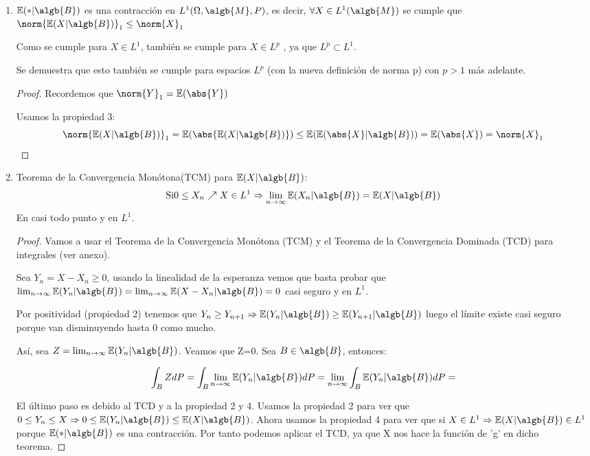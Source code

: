 \documentclass{apuntes}
\begin{document}
\begin{enumerate}
\begin{proof}
\end{proof} 
\item $\mathbb{E}(*|\algb{B})$ es una contracción en $L^1(\Omega, \algb{M},P)$, es decir, $\forall X \in L^1(\algb{M})$ se cumple que $\norm{\mathbb{E}(X|\algb{B})}_1 \leq \norm{X}_1$

\obs Como se cumple para $X \in L^1$, también se cumple para $X \in L^p$ , ya que $L^p \subset L^1$. 

\obs Se demuestra que esto también se cumple para espacios $L^p$ (con la nueva definición de norma p) con $p>1$ más adelante.

\begin{proof}

Recordemos que $\norm{Y}_1 = \mathbb{E}(\abs{Y})$

Usamos la propiedad 3:
\[\norm{\mathbb{E}(X|\algb{B})}_1=
\mathbb{E}(\abs{\mathbb{E}(X|\algb{B})}) \leq \mathbb{E}(\mathbb{E}(\abs{X}|\algb{B})) = \mathbb{E}(\abs{X}) = \norm{X}_1
\]
\end{proof}
\item Teorema de la Convergencia Monótona(TCM) para $\mathbb{E}(X|\algb{B})$:
\[
\text{Si} 0\leq X_n \nearrow X \in L^1 \Rightarrow \lim_{n \rightarrow \infty} \mathbb{E}(X_n|\algb{B}) = \mathbb{E}(X|\algb{B})
\]
En casi todo punto y en $L^1$.

\begin{proof}
Vamos a usar el Teorema de la Convergencia Monótona (TCM) y el Teorema de la Convergencia Dominada (TCD) para integrales (ver anexo).

Sea $Y_n=X-X_n \geq 0$, usando la linealidad de la esperanza vemos que basta probar que $\lim_{n \rightarrow \infty} \mathbb{E}(Y_n|\algb{B})= \lim_{n \rightarrow \infty} \mathbb{E}(X-X_n|\algb{B}) = 0$ casi seguro y en $L^1$.

Por positividad (propiedad 2) tenemos que $Y_n \geq Y_{n+1} \Rightarrow \mathbb{E}(Y_n|\algb{B}) \geq \mathbb{E}(Y_{n+1}|\algb{B})$ luego el límite existe casi seguro porque van disminuyendo hasta 0 como mucho.

Así, sea $Z=\lim_{n \rightarrow \infty} \mathbb{E}(Y_n|\algb{B})$. Veamos que Z=0. Sea $B \in \algb{B}$, entonces:

\[
\int_B ZdP= \int_B \lim_{n \rightarrow \infty}\mathbb{E}(Y_n|\algb{B})dP= \lim_{n \rightarrow \infty}\int_B \mathbb{E}(Y_n|\algb{B})dP = 
\]

El último paso es debido al TCD y a la propiedad 2 y 4. Usamos la propiedad 2 para ver que $0 \leq Y_n \leq X \Rightarrow 0 \leq \mathbb{E}(Y_n|\algb{B}) \leq \mathbb{E}(X|\algb{B})$.  Ahora usamos la propiedad 4 para ver que si $X\in L^1 \Rightarrow \mathbb{E}(X|\algb{B})\in L^1$ porque $\mathbb{E}(*|\algb{B})$ es una contracción. Por tanto podemos aplicar el TCD, ya que X nos hace la función de 'g' en dicho teorema.


\end{proof}
\end{enumerate}
\end{document}
